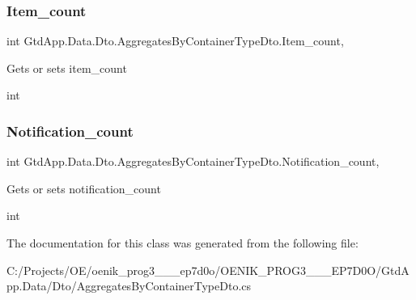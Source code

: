 \subsubsection{Item\+\_\+count}
{\footnotesize\ttfamily int Gtd\+App.\+Data.\+Dto.\+Aggregates\+By\+Container\+Type\+Dto.\+Item\+\_\+count\hspace{0.3cm}{\ttfamily [get]}, {\ttfamily [set]}}



Gets or sets item\+\_\+count 

int\mbox{\label{class_gtd_app_1_1_data_1_1_dto_1_1_aggregates_by_container_type_dto_a6e3f6d54c17b753df1d669f8fdb51b77}} 
\subsubsection{Notification\+\_\+count}
{\footnotesize\ttfamily int Gtd\+App.\+Data.\+Dto.\+Aggregates\+By\+Container\+Type\+Dto.\+Notification\+\_\+count\hspace{0.3cm}{\ttfamily [get]}, {\ttfamily [set]}}



Gets or sets notification\+\_\+count 

int

The documentation for this class was generated from the following file\+:\begin{DoxyCompactItemize}
\item 
C\+:/\+Projects/\+O\+E/oenik\+\_\+prog3\+\_\+\_\+\_\+ep7d0o/\+O\+E\+N\+I\+K\+\_\+\+P\+R\+O\+G3\+\_\+\_\+\_\+\+E\+P7\+D0\+O/\+Gtd\+App.\+Data/\+Dto/Aggregates\+By\+Container\+Type\+Dto.\+cs\end{DoxyCompactItemize}
